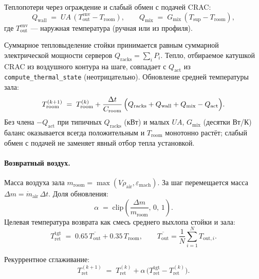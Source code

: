 \documentclass[12pt,a4paper]{article}
\begin{document}
Теплопотери через ограждение и слабый обмен с подачей CRAC:
\begin{equation}
  Q_{\mathrm{wall}} \;=\; UA\,(T_{\mathrm{out}}^{\mathrm{env}} - T_{\mathrm{room}}), \qquad
  Q_{\mathrm{mix}} \;=\; G_{\mathrm{mix}}\,(T_{\mathrm{sup}} - T_{\mathrm{room}}),
\end{equation}
где $T_{\mathrm{out}}^{\mathrm{env}}$ --- наружная температура (ручная или из профиля).

Суммарное тепловыделение стойки принимается равным суммарной электрической мощности серверов
$Q_{\mathrm{racks}} = \sum_i P_i$. Тепло, отбираемое катушкой CRAC из воздушного контура на шаге,
совпадает с $Q_{\mathrm{act}}$ из \texttt{compute\_thermal\_state} (неотрицательно). Обновление средней
температуры зала:
\begin{equation}
  T_{\mathrm{room}}^{(k+1)} \;=\; T_{\mathrm{room}}^{(k)}
  + \frac{\Delta t}{C_{\mathrm{room}}}\,\Bigl(Q_{\mathrm{racks}} + Q_{\mathrm{wall}} + Q_{\mathrm{mix}}
  - Q_{\mathrm{act}}\Bigr).
\end{equation}
Без члена $-Q_{\mathrm{act}}$ при типичных $Q_{\mathrm{racks}}$ (кВт) и малых $UA$, $G_{\mathrm{mix}}$
(десятки Вт/К) баланс оказывается всегда положительным и $T_{\mathrm{room}}$ монотонно растёт; слабый
обмен с подачей не заменяет явный отбор тепла установкой.

\paragraph{Возвратный воздух.}
Масса воздуха зала $m_{\mathrm{room}} = \max(V \rho_{\mathrm{air}}, \varepsilon_{\mathrm{mach}})$.
За шаг перемещается масса $\Delta m = \dot m_{\mathrm{air}}\,\Delta t$. Доля обновления:
\begin{equation}
  \alpha \;=\; \mathrm{clip}\left(\frac{\Delta m}{m_{\mathrm{room}}},\, 0,\, 1\right).
\end{equation}
Целевая температура возврата как смесь среднего выхлопа стойки и зала:
\begin{equation}
  T_{\mathrm{ret}}^{\mathrm{tgt}} \;=\; 0.65\,\overline{T_{\mathrm{out}}} + 0.35\, T_{\mathrm{room}},
  \qquad
  \overline{T_{\mathrm{out}}} = \frac{1}{N}\sum_{i=1}^{N} T_{\mathrm{out},i}.
\end{equation}

Рекуррентное сглаживание:
\begin{equation}
  T_{\mathrm{ret}}^{(k+1)} \;=\; T_{\mathrm{ret}}^{(k)} + \alpha\,\bigl(T_{\mathrm{ret}}^{\mathrm{tgt}} - T_{\mathrm{ret}}^{(k)}\bigr).
\end{equation}
\end{document}
